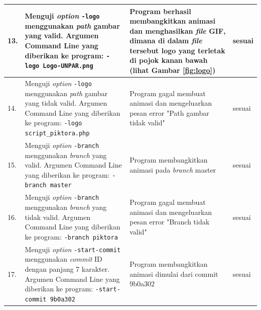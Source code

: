 \begin{table}[htbp]
\begin{tabular}{|p{0.3cm}|>{\raggedright} p{7 cm}| p{5.5 cm}| p{3 cm}|}
		13. & Menguji \textit{option} \texttt{-logo} menggunakan \textit{path} gambar yang valid. Argumen Command Line yang diberikan ke program: \texttt{-logo Logo-UNPAR.png} & Program berhasil membangkitkan animasi dan menghasilkan \textit{file} GIF, dimana di dalam \textit{file} tersebut logo yang terletak di pojok kanan bawah (lihat Gambar \ref{fig:logo}) & sesuai  \\ \hline
		14. & Menguji \textit{option} \texttt{-logo} menggunakan \textit{path} gambar yang tidak valid. Argumen Command Line yang diberikan ke program: \texttt{-logo script\_piktora.php} & Program gagal membuat animasi dan mengeluarkan pesan error "Path gambar tidak valid" & sesuai  \\ \hline
		15. & Menguji \textit{option} \texttt{-branch} menggunakan \textit{branch} yang valid. Argumen Command Line yang diberikan ke program: \texttt{-branch master} & Program membangkitkan animasi pada \textit{branch} master & sesuai  \\ \hline
		16. & Menguji \textit{option} \texttt{-branch} menggunakan \textit{branch} yang tidak valid. Argumen Command Line yang diberikan ke program: \texttt{-branch piktora}  & Program gagal membuat animasi dan mengeluarkan pesan error "Branch tidak valid" & sesuai  \\ \hline
		17. & Menguji \textit{option} \texttt{-start-commit} menggunakan \textit{commit} ID dengan panjang 7 karakter. Argumen Command Line yang diberikan ke program:  \texttt{-start-commit 9b0a302} & Program membangkitkan animasi dimulai dari commit 9b0a302 & sesuai  \\ \hline		
		
		
\end{tabular}
	\label{table:hasil_pengujian2}
\end{table}


